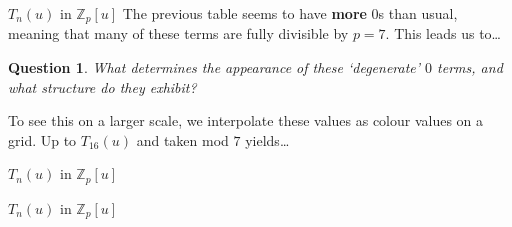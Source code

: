 \documentclass{beamer}
\newtheorem{question}{Question}
\begin{document}
\begin{frame}{$T_n(u)$ in $\mathbb{Z}_p[u]$}
 The previous table seems to have \textbf{more} $0$s than usual, meaning that many of these terms are fully divisible by $p=7$. This leads us to\dots \pause
 \vspace{12pt}
 \begin{question}
  What determines the appearance of these `degenerate' $0$ terms, and what structure do they exhibit?
 \end{question} \pause
 \vspace{12pt}
 To see this on a larger scale, we interpolate these values as colour values on a grid. Up to $T_{16}(u)$ and taken mod $7$ yields\dots
\end{frame}

\begin{frame}{$T_n(u)$ in $\mathbb{Z}_p[u]$}
 \vspace{-18pt}
\end{frame}

\begin{frame}{$T_n(u)$ in $\mathbb{Z}_p[u]$}
\end{frame}
\end{document}
